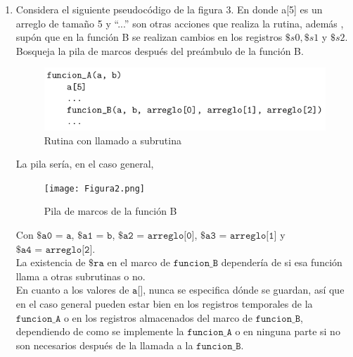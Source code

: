 \documentclass{article}
\begin{document}
\begin{enumerate}
{\begin{enumerate}
{			Y este caso se daría cuando no se usen registros almacenados en la
			subrutina hoja.\\
			}
		\end{enumerate}
		
	
	}
	
		
	\item{
	Considera el siguiente pseudocódigo de la figura 3. En donde a[5] es un
	arreglo de tamaño 5 y “...” son otras acciones que realiza la rutina, además
	, supón que en la función B se realizan cambios en los registros $\$s0,
	\$s1$ y $\$s2$. Bosqueja la pila de marcos después del preámbulo de la 
	función B.
	
	\begin{figure}[H]
		\centering
		\includegraphics[scale=0.5]{Figura1.png}
		\caption{Rutina con llamado a subrutina}
	\end{figure}

	La pila sería, en el caso general,
	
	\begin{figure}[H]
		\centering
		\texttt{[image: Figura2.png]}
		\caption{Pila de marcos de la función B}
	\end{figure}
	}
	Con $\texttt{\$a0 = a}$, $\texttt{\$a1 = b}$, $\texttt{\$a2 = arreglo[0]}$,
	$\texttt{\$a3 = arreglo[1]}$ y $\texttt{\$a4 = arreglo[2]}$.\\
	
	La existencia de $\texttt{\$ra}$ en el marco de $\texttt{funcion\_B}$
	dependería de si esa función llama a otras subrutinas o no.\\
	En cuanto a los valores de $\texttt{a[]}$, nunca se especifica dónde se
	guardan, así que en el caso general pueden estar bien en los registros 
	temporales de la $\texttt{funcion\_A}$ o en los registros almacenados del
	marco de $\texttt{funcion\_B}$, dependiendo de como se implemente la 
	$\texttt{funcion\_A}$ o en ninguna parte si no son necesarios después de la
	llamada a la $\texttt{funcion\_B}$.
    \end{enumerate}
\end{document}
